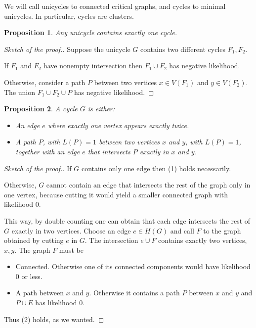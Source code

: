 \documentclass[11pt,notitlepage]{report}
\newtheorem{proposition}{Proposition}[chapter]
\theoremstyle{definition}
\begin{document}
We will call unicycles to connected critical graphs, and cycles
to minimal unicycles. In particular, cycles are clusters. 

\begin{proposition}
	Any unicycle contains exactly one cycle. 
\end{proposition}
\begin{proof}[Sketch of the proof.]
 	Suppose the unicycle $G$ contains two different cycles $F_1,F_2$.
 	\item If $F_1$ and $F_2$ have nonempty intersection then $F_1\cup F_2$ 
 	has negative likelihood.
 	\item Otherwise, consider a path $P$ between two vertices $x\in V(F_1)$
 	and $y\in V(F_2)$. The union $F_1\cup F_2 \cup P$ has negative likelihood.
\end{proof}

\begin{proposition}
	A cycle $G$ is either:
	\begin{itemize}
		\item[(1)] An edge $e$ where exactly one vertex appears exactly
		twice.
		\item[(2)] A path $P$, with $L(P)=1$
		between two vertices $x$ and $y$, with
		$L(P)=1$, together with an edge $e$ that intersects $P$ exactly
		in $x$ and $y$.
	\end{itemize}
\end{proposition} 
\begin{proof}[Sketch of the proof.]
	\item If $G$ contains only one edge then (1) holds necessarily.
	
	\item Otherwise, $G$ cannot contain an edge that intersects the rest of the graph
	only in one vertex, because cutting it would yield a smaller connected 
	graph with likelihood $0$. 
	
	This way, by double counting one can obtain that 
	each edge intersects the rest of $G$ exactly in two vertices.
	Choose an edge $e\in H(G)$ and call $F$ to the graph obtained by
	cutting $e$ in $G$. The intersection $e\cup F$ contains exactly two 
	vertices, $x, y$. The graph $F$ must be 
	\begin{itemize}
		\item Connected. Otherwise one of its connected components would have
		likelihood $0$ or less.
		\item A path between $x$ and $y$. Otherwise it contains a path $P$ between
		$x$ and $y$ and $P\cup E$ has likelihood $0$. 
	\end{itemize} 
	Thus (2) holds, as we wanted. 
\end{proof}
\end{document}
